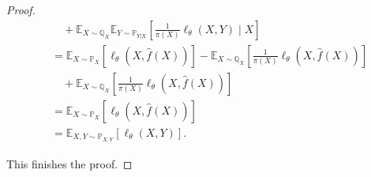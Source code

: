 \begin{proof}
\begin{align*}
& \quad  +  \mathbb{E}_{X\sim\mathbb{Q}_X}\mathbb{E}_{Y\sim \mathbb{P}_{Y|X}}\left[\frac{1}{\pi(X)}\ell_\theta(X, Y) \mid X\right] \\
& = \mathbb{E}_{X\sim\mathbb{P}_X}[\ell_\theta(X, \hat f(X))] - \mathbb{E}_{X\sim\mathbb{Q}_X}\left[\frac{1}{\pi(X)}\ell_\theta(X, \hat f(X))\right] \\
& \quad  +  \mathbb{E}_{X\sim\mathbb{Q}_X}\left[\frac{1}{\pi(X)}\ell_\theta(X, \hat f(X))  \right] \\
& = \mathbb{E}_{X\sim\mathbb{P}_X}[\ell_\theta(X, \hat f(X))] \\ 
& = \mathbb{E}_{X, Y\sim\mathbb{P}_{X, Y}}\left[\ell_\theta(X, Y)\right].
\end{align*}

This finishes the proof.
\end{proof}